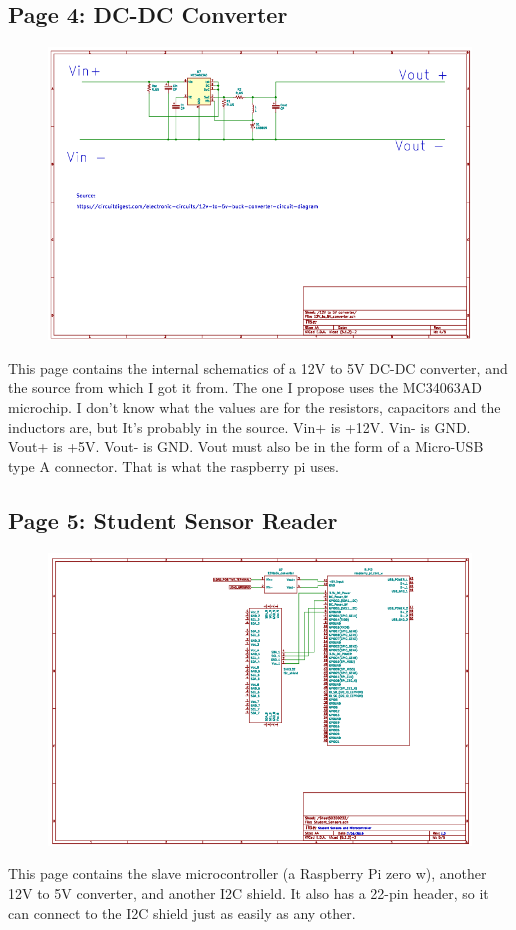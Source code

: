 \subsection{Page 4: DC-DC Converter}
\begin{figure}
	\includegraphics{./graphics/schematic/sch_page_4.png}
\end{figure}
This page contains the internal schematics of a 12V to 5V DC-DC converter, and the source from which I got it from.
The one I propose uses the MC34063AD microchip. I don’t know what the values are for the resistors, capacitors and the inductors are, but It’s probably in the source.
Vin+ is +12V.
Vin- is GND.
Vout+ is +5V.
Vout- is GND.
Vout must also be in the form of a Micro-USB type A connector. That is what the raspberry pi uses.
\subsection{Page 5: Student Sensor Reader}
\begin{figure}
	\includegraphics{./graphics/schematic/sch_page_5.png}
\end{figure}
This page contains the slave microcontroller (a Raspberry Pi zero w), another 12V to 5V converter, and another I2C shield.
It also has a 22-pin header, so it can connect to the I2C shield just as easily as any other. 

